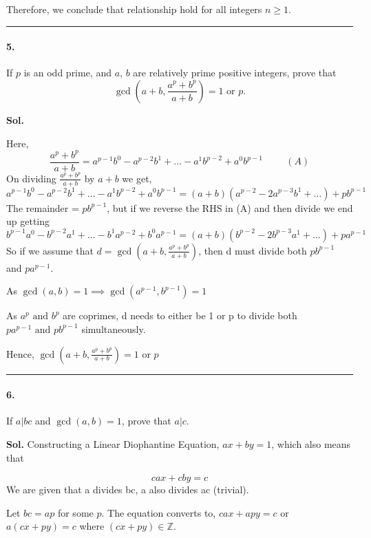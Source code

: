 \documentclass[12pt]{amsart}
\begin{document}
Therefore, we conclude that relationship hold for all integers $n \ge 1.$

\par\noindent\textcolor{gray}{\rule{\textwidth}{0.5pt}}
\smallskip

\paragraph*{5.} If $p$ is an odd prime, and $a$, $b$ are relatively prime positive integers, prove that $$\gcd{\left(a+b,\frac{a^p+b^p}{a+b}\right)} = 1 \text{ or } p.$$

\bigskip
\textbf{Sol.}
 
Here,
$$ 
\boxed{
    \frac{a^p+b^p}{a+b} = a^{p-1}b^0 - a^{p-2}b^1 +\dotsc - a^1b^{p-2} + a^0b^{p-1}
} \hspace{1cm} (A)
$$
\linebreak
On dividing $\frac{a^p+b^p}{a+b}$ by $a+b$ we get,
$$
a^{p-1}b^0 - a^{p-2}b^1 +\dotsc - a^1b^{p-2} + a^0b^{p-1} = (a+b)(a^{p-2} - 2a^{p-3}b^1 +\dotsc) + pb^{p-1}
$$
The remainder = $pb^{p-1}$, but if we reverse the RHS in (A) and then divide we end up getting
$$
b^{p-1}a^0 - b^{p-2}a^1 +\dotsc - b^1a^{p-2} + b^0a^{p-1} = (a+b)(b^{p-2} - 2b^{p-3}a^1 +\dotsc) + pa^{p-1}
$$
So if we assume that $d = \gcd{\left(a+b,\frac{a^p+b^p}{a+b}\right)}$, then d must divide both $pb^{p-1}$ and $pa^{p-1}$.

As $\gcd{(a, b)} = 1 \implies \gcd{(a^{p-1}, b^{p - 1})} = 1$

As $a^p \text{ and } b^p$ are coprimes, d needs to either be 1 or p to divide both $pa^{p-1} \text{ and } pb^{p-1}$ simultaneously.


Hence, $\gcd{\left(a+b,\frac{a^p+b^p}{a+b}\right)} = 1$ or $p$ 
\par\noindent\textcolor{gray}{\rule{\textwidth}{0.5pt}}
\smallskip

\paragraph*{6.} If $a|bc$ and $\gcd{(a, b)} = 1$, prove that $a|c$.

\bigskip
\textbf{Sol.}
Constructing a Linear Diophantine Equation, $ ax+by=1 $, which also means that 

$$ cax + cby = c $$
We are given that a divides bc, a also divides ac (trivial).

Let $bc = ap$ for some $p$. The equation converts to, $ cax + apy = c $ or $ a(cx + py) = c$ where $(cx + py) \in \mathbb{Z}$.
\end{document}

